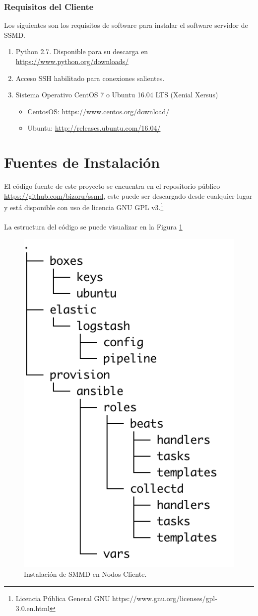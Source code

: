 \subsubsection{Requisitos del Cliente}
Los siguientes son los requisitos de software para instalar el software servidor de SSMD.
\begin{enumerate}
	\item Python 2.7. Disponible para su descarga en \url{https://www.python.org/downloads/}
	\item Acceso SSH habilitado para conexiones salientes.
    \item Sistema Operativo CentOS 7 o Ubuntu 16.04 LTS (Xenial Xersus) 
    \begin{itemize}
    	\item CentosOS: \url{https://www.centos.org/download/}
    	\item Ubuntu: \url{http://releases.ubuntu.com/16.04/}
    \end{itemize}
\end{enumerate}


\section{Fuentes de Instalación}\label{fuentes-instalacion}
El código fuente de este proyecto se encuentra en el repositorio público \url{https://github.com/bizoru/ssmd}, este puede ser descargado desde cualquier lugar 
y está disponible con uso de licencia GNU GPL v3.\footnote{Licencia Pública General GNU https://www.gnu.org/licenses/gpl-3.0.en.html}
\\\\
La estructura del código se puede visualizar en la Figura \ref{fig:estructura-fuente}

\begin{figure}[h]
 \centering
  \includegraphics[width=0.3\linewidth]{./imagenes/estructura-fuente.png}
  \caption{Instalación de SMMD en Nodos Cliente.}
  \label{fig:estructura-fuente}
\end{figure}


